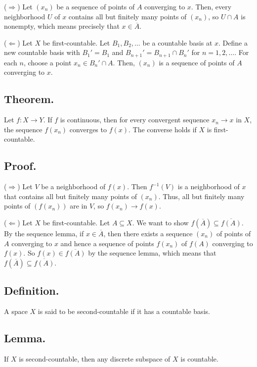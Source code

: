 \documentclass[titlepage]{article}
\begin{document}
($\Rightarrow$) Let $(x_{n})$ be a sequence of points of $A$ converging to $x$. Then, every neighborhood $U$ of $x$ contains all but finitely many points of $(x_{n})$, so $U \cap A$ is nonempty, which means precisely that $x \in \overline{A}$.

($\Leftarrow$) Let $X$ be first-countable. Let $B_{1}, B_{2}, \ldots$ be a countable basis at $x$. Define a new countable basis with $B_{1}' = B_{1}$ and $B_{n+1}' = B_{n+1} \cap B_{n}'$ for $n = 1, 2, \ldots$. For each $n$, choose a point $x_{n} \in B_{n}' \cap A$. Then, $(x_{n})$ is a sequence of points of $A$ converging to $x$.

\subsection{Theorem.} Let $f: X \to Y$. If $f$ is continuous, then for every convergent sequence $x_{n} \to x$ in $X$, the sequence $f(x_{n})$ converges to $f(x)$. The converse holds if $X$ is first-countable.

\subsection{Proof.}

($\Rightarrow$) Let $V$ be a neighborhood of $f(x)$. Then $f^{-1}(V)$ is a neighborhood of $x$ that contains all but finitely many points of $(x_{n})$. Thus, all but finitely many points of $(f(x_{n}))$ are in $V$, so $f(x_{n}) \to f(x)$.

($\Leftarrow$) Let $X$ be first-countable. Let $A \subseteq X$. We want to show $f(\overline{A}) \subseteq \overline{f(A)}$. By the sequence lemma, if $x \in \overline{A}$, then there exists a sequence $(x_{n})$ of points of $A$ converging to $x$ and hence a sequence of points $f(x_{n})$ of $f(A)$ converging to $f(x)$. So $f(x) \in \overline{f(A)}$ by the sequence lemma, which means that $f(\overline{A}) \subseteq \overline{f(A)}$.

\subsection{Definition.} A space $X$ is said to be second-countable if it has a countable basis.

\subsection{Lemma.} If $X$ is second-countable, then any discrete subspace of $X$ is countable.
\end{document}
